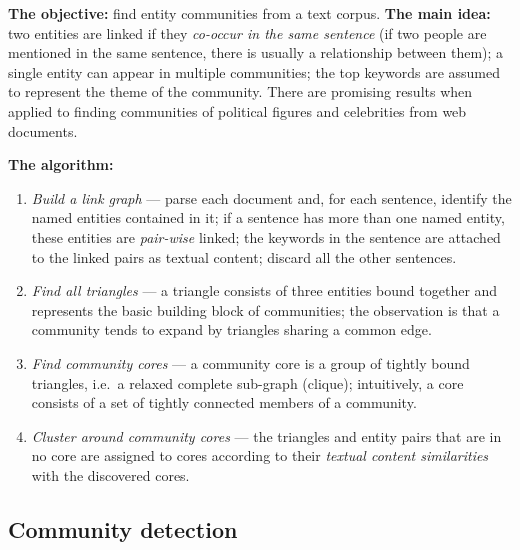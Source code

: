 \documentclass[11pt,a4paper]{article}
\theoremstyle{definition}
\begin{document}
\begin{defbox}
\textbf{The objective:} find entity communities from a text corpus. \textbf{The main idea:} two
entities are linked if they \emph{co-occur in the same sentence} (if two people are mentioned in the
same sentence, there is usually a relationship between them); a single entity can appear in multiple
communities; the top keywords are assumed to represent the theme of the community. There are promising
results when applied to finding communities of political figures and celebrities from web documents.

\textbf{The algorithm:}
\begin{enumerate}
\item \emph{Build a link graph} --- parse each document and, for each sentence, identify the named
      entities contained in it; if a sentence has more than one named entity, these entities are
      \emph{pair-wise} linked; the keywords in the sentence are attached to the linked pairs as
      textual content; discard all the other sentences.
\item \emph{Find all triangles} --- a triangle consists of three entities bound together and
      represents the basic building block of communities; the observation is that a community tends to
      expand by triangles sharing a common edge.
\item \emph{Find community cores} --- a community core is a group of tightly bound triangles, i.e.\ a
      relaxed complete sub-graph (clique); intuitively, a core consists of a set of tightly connected
      members of a community.
\item \emph{Cluster around community cores} --- the triangles and entity pairs that are in no core are
      assigned to cores according to their \emph{textual content similarities} with the discovered
      cores.
\end{enumerate}
\end{defbox}

\subsection{Community detection}
\end{document}

